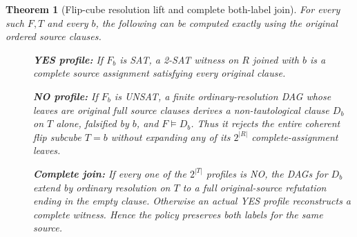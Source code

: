 \documentclass[11pt]{article}
\newtheorem{theorem}{Theorem}
\begin{document}
\begin{theorem}[Flip-cube resolution lift and complete both-label join]\label{th:lift}
For every such $F,T$ and every $b$, the following can be computed exactly using the original ordered source clauses.
\begin{description}
\item[] \textbf{YES profile:} If $F_b$ is SAT, a 2-SAT witness on $R$ joined with $b$ is a complete source assignment satisfying every original clause.
\item[] \textbf{NO profile:} If $F_b$ is UNSAT, a finite ordinary-resolution DAG whose leaves are \emph{original full source clauses} derives a non-tautological clause $D_b$ on $T$ alone, falsified by $b$, and $F\models D_b$. Thus it rejects the entire coherent flip subcube $T=b$ without expanding any of its $2^{|R|}$ complete-assignment leaves.
\item[] \textbf{Complete join:} If every one of the $2^{|T|}$ profiles is NO, the DAGs for $D_b$ extend by ordinary resolution on $T$ to a full original-source refutation ending in the empty clause. Otherwise an actual YES profile reconstructs a complete witness. Hence the policy preserves both labels for the same source.
\end{description}
\end{theorem}
\end{document}
